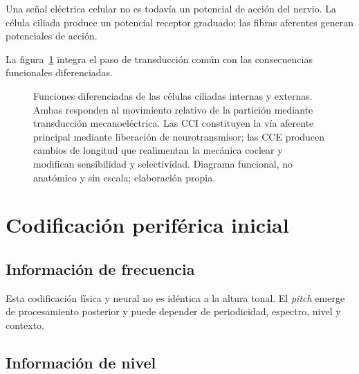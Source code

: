 Una señal eléctrica celular no es todavía un potencial de acción del nervio.
La célula ciliada produce un potencial receptor graduado; las fibras
aferentes generan potenciales de acción.

La figura~\ref{fig:u6-funciones-cci-cce} integra el paso de transducción común
con las consecuencias funcionales diferenciadas.

\begin{figure}[!htbp]
    \centering
    
    \caption{Funciones diferenciadas de las células ciliadas internas y
    externas. Ambas responden al movimiento relativo de la partición mediante
    transducción mecanoeléctrica. Las CCI constituyen la vía aferente principal
    mediante liberación de neurotransmisor; las CCE producen cambios de
    longitud que realimentan la mecánica coclear y modifican sensibilidad y
    selectividad. Diagrama funcional, no anatómico y sin escala; elaboración
    propia.}
    \label{fig:u6-funciones-cci-cce}
\end{figure}

\section{Codificación periférica inicial}
\label{sec:u6-codificacion}

\subsection{Información de frecuencia}
\label{sec:u6-codigo-frecuencia}


Esta codificación física y neural no es idéntica a la altura tonal. El
\emph{pitch} emerge de procesamiento posterior y puede depender de
periodicidad, espectro, nivel y contexto.

\subsection{Información de nivel}
\label{sec:u6-codigo-nivel}

